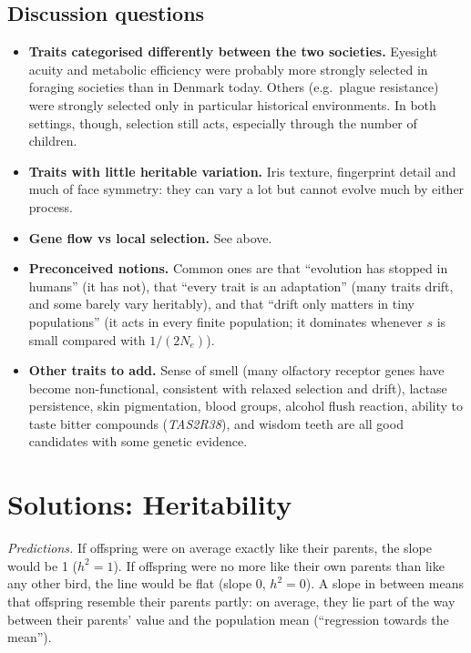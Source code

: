 \documentclass[
  a4paper]{book}
\providecommand{\tightlist}{%
  \setlength{\itemsep}{0pt}\setlength{\parskip}{0pt}}
\begin{document}
\subsection{Discussion questions}\label{discussion-questions}

\begin{itemize}
\tightlist
\item
  \textbf{Traits categorised differently between the two societies.} Eyesight acuity and metabolic efficiency were probably more strongly selected in foraging societies than in Denmark today. Others (e.g.~plague resistance) were strongly selected only in particular historical environments. In both settings, though, selection still acts, especially through the number of children.
\item
  \textbf{Traits with little heritable variation.} Iris texture, fingerprint detail and much of face symmetry: they can vary a lot but cannot evolve much by either process.
\item
  \textbf{Gene flow vs local selection.} See above.
\item
  \textbf{Preconceived notions.} Common ones are that ``evolution has stopped in humans'' (it has not), that ``every trait is an adaptation'' (many traits drift, and some barely vary heritably), and that ``drift only matters in tiny populations'' (it acts in every finite population; it dominates whenever \(s\) is small compared with \(1/(2N_e)\)).
\item
  \textbf{Other traits to add.} Sense of smell (many olfactory receptor genes have become non-functional, consistent with relaxed selection and drift), lactase persistence, skin pigmentation, blood groups, alcohol flush reaction, ability to taste bitter compounds (\emph{TAS2R38}), and wisdom teeth are all good candidates with some genetic evidence.
\end{itemize}

\section{Solutions: Heritability}\label{solutions-heritability}

\emph{Predictions.} If offspring were on average exactly like their parents, the slope would be 1 (\(h^2 = 1\)). If offspring were no more like their own parents than like any other bird, the line would be flat (slope 0, \(h^2 = 0\)). A slope in between means that offspring resemble their parents partly: on average, they lie part of the way between their parents' value and the population mean (``regression towards the mean'').
\end{document}
